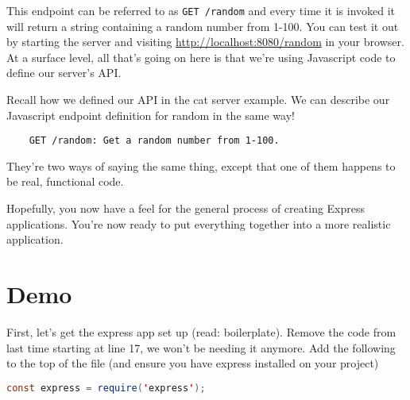This endpoint can be referred to as \texttt{GET /random} and every time it is invoked it will return a string containing a random number from 1-100. You can test it out by starting the server and visiting \url{http://localhost:8080/random} in your browser. At a surface level, all that's going on here is that we're using Javascript code to define our server's API. 

\begin{kaobox}[title=Describing the API with English]
    Recall how we defined our API in the cat server example. We can describe our Javascript endpoint definition for random in the same way! 

    \begin{verbatim}
    GET /random: Get a random number from 1-100.
    \end{verbatim}
    
    They're two ways of saying the same thing, except that one of them happens to be real, functional code.
\end{kaobox}

Hopefully, you now have a feel for the general process of creating Express applications. You're now ready to put everything together into a more realistic application.

\section{Demo}

First, let's get the express app set up (read: boilerplate). Remove the code from last time starting at line 17, we won't be needing it anymore. Add the following to the top of the file (and ensure you have express installed on your project)

\begin{lstlisting}[language=Java]
    const express = require('express');
\end{lstlisting}


